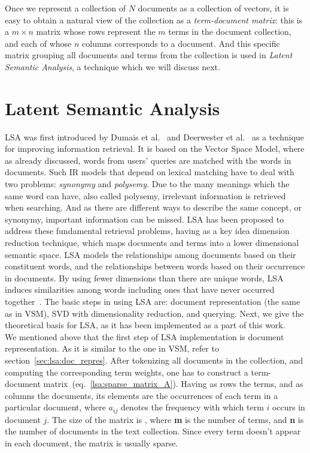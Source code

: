 Once we represent a collection of $N$ documents as a collection of vectors, it is easy to obtain a natural view of the collection as a \textit{term-document matrix}: this is a $m \times n$ matrix whose rows represent the $m$ terms in the document collection, and each of whose $n$ columns corresponds to a document. And this specific matrix grouping all documents and terms from the collection is used in \textit{Latent Semantic Analysis}, a technique which we will discuss next.\\

\section{Latent Semantic Analysis}
\gls{LSA} was first introduced by Dumais et al.~\cite{Dumais88usingLSA} and Deerwester et al.~\cite{Deerw90_LSA} as a technique for improving information retrieval. It is based on the Vector Space Model, where as already discussed, words from users' queries are matched with the words in documents. Such \gls{IR} models that depend on lexical matching have to deal with two problems: \textit{synonymy} and \textit{polysemy}. Due to the many meanings which the same word can have, also called polysemy, irrelevant information is retrieved when searching. And as there are different ways to describe the same concept, or synonymy, important information can be missed. \gls{LSA} has been proposed to address these fundamental retrieval problems, having as a key idea dimension reduction technique, which maps documents and terms into a lower dimensional semantic space. \gls{LSA} models the relationships among documents based on their constituent words, and the relationships between words based on their occurrence in documents. By using fewer dimensions than there are unique words, \gls{LSA} induces similarities among words including ones that have never occurred together~\cite{Dumais2006}. The basic steps in using \gls{LSA} are: document representation (the same as in \gls{VSM}), \gls{SVD} with dimensionality reduction, and querying. Next, we give the theoretical basis for \gls{LSA}, as it has been implemented as a part of this work. \\


We mentioned above that the first step of \gls{LSA} implementation is document representation. As it is similar to the one in \gls{VSM}, refer to section~\ref{sec:lsa:doc_repres}. After tokenizing all documents in the collection, and computing the corresponding term weights, one has to construct a term-document matrix~(eq.~\ref{lsa:sparse_matrix_A}). Having as rows the terms, and as columns the documents, its elements are the occurrences of each term in a particular document, where $ a_{ij} $ denotes the frequency with which term $ i $ occurs in document $ j $. The size of the matrix is , where {\bf m} is the number of terms, and {\bf n} is the number of documents in the text collection. Since every term doesn't appear in each document, the matrix is usually sparse. \\

